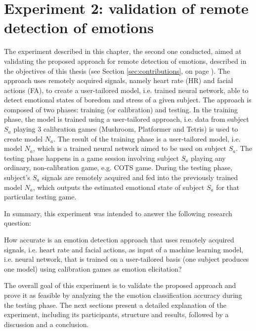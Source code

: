 \chapter{Experiment 2: validation of remote detection of emotions}
\label{ch:experiment2}

The experiment described in this chapter, the second one conducted, aimed at validating the proposed approach for remote detection of emotions, described in the objectives of this thesis (see Section \ref{sec:contributions}, on page \pageref{sec:contributions}). The approach uses remotely acquired signals, namely heart rate (HR) and facial actions (FA), to create a user-tailored model, i.e. trained neural network, able to detect emotional states of boredom and stress of a given subject. The approach is composed of two phases: training (or calibration) and testing. In the training phase, the model is trained using a user-tailored approach, i.e. data from subject $S_a$ playing 3 calibration games (Mushroom, Platformer and Tetris) is used to create model $N_a$. The result of the training phase is a user-tailored model, i.e. model $N_a$, which is a trained neural network aimed to be used on subject $S_a$. The testing phase happens in a game session involving subject $S_a$ playing any ordinary, non-calibration game, e.g. COTS game. During the testing phase, subject's $S_a$ signals are remotely acquired and fed into the previously trained model $N_a$, which outputs the estimated emotional state of subject $S_a$ for that particular testing game.

In summary, this experiment was intended to answer the following research question:

\begin{fquote}
How accurate is an emotion detection approach that uses remotely acquired signals, i.e. heart rate and facial actions, as input of a machine learning model, i.e. neural network, that is trained on a user-tailored basis (one subject produces one model) using calibration games as emotion elicitation?
\end{fquote}

The overall goal of this experiment is to validate the proposed approach and prove it as feasible by analyzing the the emotion classification accuracy during the testing phase. The next sections present a detailed explanation of the experiment, including its participants, structure and results, followed by a discussion and a conclusion.

